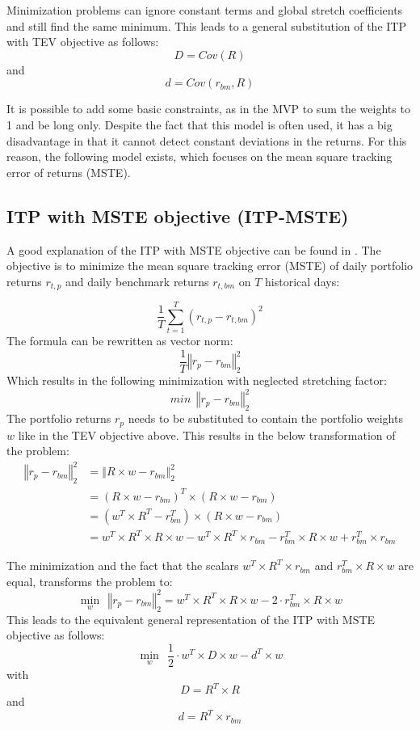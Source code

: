 \documentclass[
  oneside]{book}
\begin{document}
Minimization problems can ignore constant terms and global stretch coefficients and still find the same minimum. This leads to a general substitution of the ITP with TEV objective as follows:
\[
  D = Cov(R)
\]
and
\[
d = Cov(r_{bm}, R)
\]

It is possible to add some basic constraints, as in the MVP to sum the weights to 1 and be long only. Despite the fact that this model is often used, it has a big disadvantage in that it cannot detect constant deviations in the returns. For this reason, the following model exists, which focuses on the mean square tracking error of returns (MSTE).

\hypertarget{itp-with-mste-objective-itp-mste}{%
\subsection{ITP with MSTE objective (ITP-MSTE)}\label{itp-with-mste-objective-itp-mste}}

A good explanation of the ITP with MSTE objective can be found in \citep{AhBa2017}. The objective is to minimize the mean square tracking error (MSTE) of daily portfolio returns \(r_{t, p}\) and daily benchmark returns \(r_{t, bm}\) on \(T\) historical days:

\[
  \frac{1}{T} \sum^T_{t=1}(r_{t, p}-r_{t, bm})^2
\]
The formula can be rewritten as vector norm:
\[
  \frac{1}{T} \left\Vert r_{p}-r_{bm} \right\Vert_2^2
\]
Which results in the following minimization with neglected stretching factor:
\[
 min \ \  \left\Vert r_{p}-r_{bm} \right\Vert_2^2
\]
The portfolio returns \(r_p\) needs to be substituted to contain the portfolio weights \(w\) like in the TEV objective above. This results in the below transformation of the problem:
\begin{align*}
  \left\Vert r_{p}-r_{bm} \right\Vert_2^2 &= \left\Vert R \times w-r_{bm} \right\Vert_2^2 \\ 
  &= (R \times w-r_{bm})^T \times (R \times w-r_{bm}) \\ 
  &= (w^T \times R^T-r_{bm}^T) \times (R \times w-r_{bm}) \\ 
  &= w^T \times R^T \times R \times w - w^T \times R^T \times r_{bm} - r_{bm}^T \times R \times w + r_{bm}^T \times r_{bm} 
\end{align*}

The minimization and the fact that the scalars \(w^T \times R^T \times r_{bm}\) and \(r_{bm}^T \times R \times w\) are equal, transforms the problem to:
\[
  \min\limits_{w} \ \  \left\Vert r_{p}-r_{bm} \right\Vert_2^2 
  = w^T \times R^T \times R \times w - 2\cdot r_{bm}^T \times R \times w
\]
This leads to the equivalent general representation of the ITP with MSTE objective as follows:
\[
  \min\limits_{w} \ \ \frac{1}{2} \cdot w^T \times D \times w - d^T \times w
\]
with
\[
D = R^T \times R
\]
and
\[
  d = R^T \times r_{bm}
\]
\end{document}

